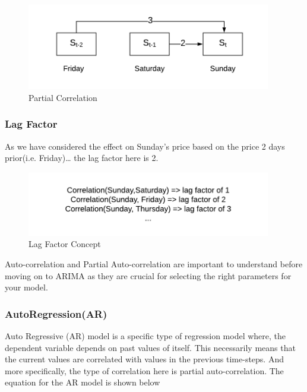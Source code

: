 \documentclass[12pt]{report}
\begin{document}
\begin{figure}[H]%
  \begin {center}
  \includegraphics[width=0.95\textwidth]{images/partial_c.png}
  \caption{Partial Correlation}
  \label{fig:ecg}
  \end {center}
\end{figure}

\subsubsection{Lag Factor}
As we have considered the effect on Sunday’s price based on the price 2 days prior(i.e. Friday)… the lag factor here is 2.

\begin{figure}[H]%
  \begin {center}
  \includegraphics[width=0.95\textwidth]{images/Lag_F.png}
  \caption{Lag Factor Concept}
  \label{fig:ecg}
  \end {center}
\end{figure}

Auto-correlation and Partial Auto-correlation are important to understand before moving on to ARIMA as they are crucial for selecting the right parameters for your model. 

\subsubsection{AutoRegression(AR)}
Auto Regressive (AR) model is a specific type of regression model where, the dependent variable depends on past values of itself.
This necessarily means that the current values are correlated with values in the previous time-steps. And more specifically, the type of correlation here is partial auto-correlation.
The equation for the AR model is shown below
\end{document}
